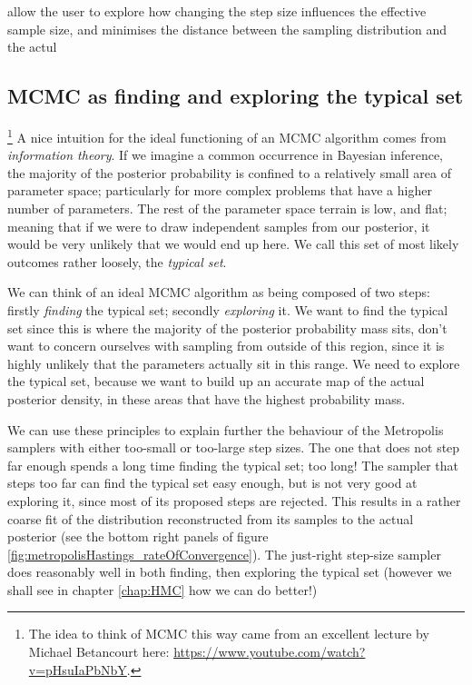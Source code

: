 \documentclass[11pt,fullpage]{book}
\begin{document}
 allow the user to explore how changing the step size influences the effective sample size, and minimises the distance between the sampling distribution and the actul

\subsection{MCMC as finding and exploring the typical set}\footnote{The idea to think of MCMC this way came from an excellent lecture by Michael Betancourt here: \url{https://www.youtube.com/watch?v=pHsuIaPbNbY}.}
A nice intuition for the ideal functioning of an MCMC algorithm comes from \textit{information theory}. If we imagine a common occurrence in Bayesian inference, the majority of the posterior probability is confined to a relatively small area of parameter space; particularly for more complex problems that have a higher number of parameters. The rest of the parameter space terrain is low, and flat; meaning that if we were to draw independent samples from our posterior, it would be very unlikely that we would end up here. We call this set of most likely outcomes rather loosely, the \textit{typical set}.

We can think of an ideal MCMC algorithm as being composed of two steps: firstly \textit{finding} the typical set; secondly \textit{exploring} it. We want to find the typical set since this is where the majority of the posterior probability mass sits, don't want to concern ourselves with sampling from outside of this region, since it is highly unlikely that the parameters actually sit in this range. We need to explore the typical set, because we want to build up an accurate map of the actual posterior density, in these areas that have the highest probability mass. 

We can use these principles to explain further the behaviour of the Metropolis samplers with either too-small or too-large step sizes. The one that does not step far enough spends a long time finding the typical set; too long! The sampler that steps too far can find the typical set easy enough, but is not very good at exploring it, since most of its proposed steps are rejected. This results in a rather coarse fit of the distribution reconstructed from its samples to the actual posterior (see the bottom right panels of figure \ref{fig:metropolisHastings_rateOfConvergence}). The just-right step-size sampler does reasonably well in both finding, then exploring the typical set (however we shall see in chapter \ref{chap:HMC} how we can do better!)
\end{document}
